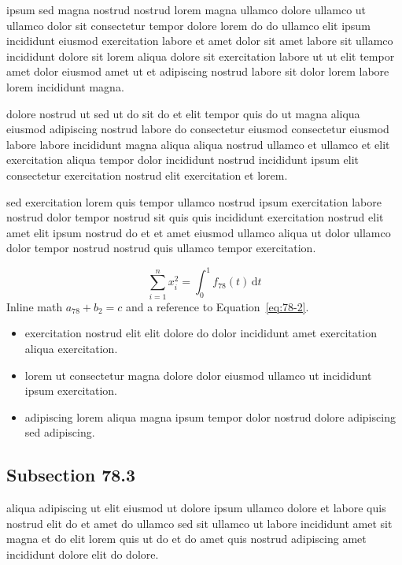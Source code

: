 \documentclass{article}
\begin{document}
ipsum sed magna nostrud nostrud lorem magna ullamco dolore ullamco ut ullamco dolor sit consectetur tempor dolore lorem do do ullamco elit ipsum incididunt eiusmod exercitation labore et amet dolor sit amet labore sit ullamco incididunt dolore sit lorem aliqua dolore sit exercitation labore ut ut elit tempor amet dolor eiusmod amet ut et adipiscing nostrud labore sit dolor lorem labore lorem incididunt magna.

dolore nostrud ut sed ut do sit do et elit tempor quis do ut magna aliqua eiusmod adipiscing nostrud labore do consectetur eiusmod consectetur eiusmod labore labore incididunt magna aliqua aliqua nostrud ullamco et ullamco et elit exercitation aliqua tempor dolor incididunt nostrud incididunt ipsum elit consectetur exercitation nostrud elit exercitation et lorem.

sed exercitation lorem quis tempor ullamco nostrud ipsum exercitation labore nostrud dolor tempor nostrud sit quis quis incididunt exercitation nostrud elit amet elit ipsum nostrud do et et amet eiusmod ullamco aliqua ut dolor ullamco dolor tempor nostrud nostrud quis ullamco tempor exercitation.

\begin{equation}\label{eq:78-2}
  \sum_{i=1}^{n} x_i^{2} = \int_0^1 f_{78}(t)\,\mathrm{d}t
\end{equation}
Inline math $a_{78} + b_{2} = c$ and a reference to Equation~\eqref{eq:78-2}.

\begin{itemize}
  \item exercitation nostrud elit elit dolore do dolor incididunt amet exercitation aliqua exercitation.
  \item lorem ut consectetur magna dolore dolor eiusmod ullamco ut incididunt ipsum exercitation.
  \item adipiscing lorem aliqua magna ipsum tempor dolor nostrud dolore adipiscing sed adipiscing.
\end{itemize}

\subsection{Subsection 78.3}\label{sec:78-3}
aliqua adipiscing ut elit eiusmod ut dolore ipsum ullamco dolore et labore quis nostrud elit do et amet do ullamco sed sit ullamco ut labore incididunt amet sit magna et do elit lorem quis ut do et do amet quis nostrud adipiscing amet incididunt dolore elit do dolore.
\end{document}
